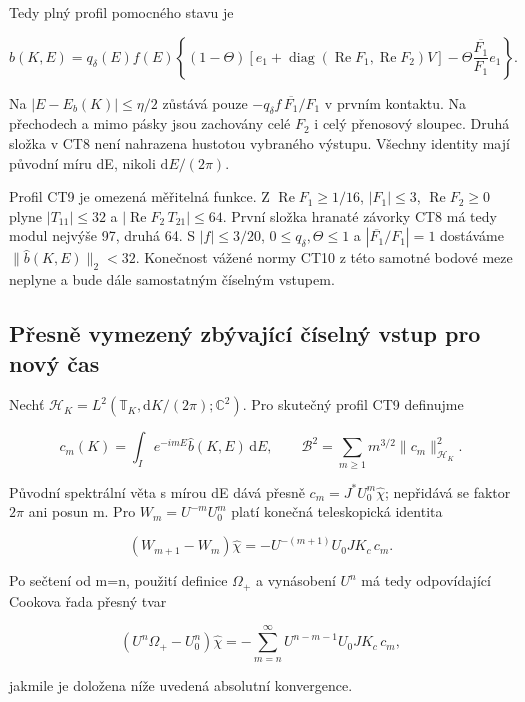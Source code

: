 \documentclass[11pt,a4paper]{article}
\theoremstyle{remark}\newtheorem{remark}[theorem]{Poznámka}
\numberwithin{equation}{section}
\begin{document}
Tedy plný profil pomocného stavu je

\[
\boxed{
\widehat b(K,E)=q_\delta(E)f(E)
\left\{(1-\Theta)
\left[e_1+\operatorname{diag}(\operatorname{Re}F_1,
\operatorname{Re}F_2)V\right]
-\Theta\frac{\overline{F_1}}{F_1}e_1\right\}.}
\tag{CT9}
\]

Na \(|E-E_b(K)|\le\eta/2\) zůstává pouze
\(-q_\delta f\,\overline{F_1}/F_1\) v prvním kontaktu. Na přechodech a
mimo pásky jsou zachovány celé \(F_2\) i celý přenosový sloupec. Druhá
složka v CT8 není nahrazena hustotou vybraného výstupu. Všechny identity
mají původní míru dE, nikoli \(\mathrm dE/(2\pi)\).

Profil CT9 je omezená měřitelná funkce. Z
\(\operatorname{Re}F_1\ge1/16\), \(|F_1|\le3\),
\(\operatorname{Re}F_2\ge0\) plyne \(|T_{11}|\le32\) a
\(|\operatorname{Re}F_2\,T_{21}|\le64\). První složka hranaté závorky
CT8 má tedy modul nejvýše 97, druhá 64. S \(|f|\le3/20\),
\(0\le q_\delta,\Theta\le1\) a \(|\overline{F_1}/F_1|=1\) dostáváme
\(\|\widehat b(K,E)\|_2<32\). Konečnost vážené normy CT10 z této samotné
bodové meze neplyne a bude dále samostatným číselným vstupem.

\hypertarget{pux159esnux11b-vymezenuxfd-zbuxfdvajuxedcuxed-ux10duxedselnuxfd-vstup-pro-novuxfd-ux10das}{%
\subsection{Přesně vymezený zbývající číselný vstup pro nový
čas}\label{pux159esnux11b-vymezenuxfd-zbuxfdvajuxedcuxed-ux10duxedselnuxfd-vstup-pro-novuxfd-ux10das}}

Nechť \(\mathcal H_K=L^2(\mathbb T_K,\mathrm dK/(2\pi);\mathbb C^2)\).
Pro skutečný profil CT9 definujme

\[
c_m(K)=\int_I e^{-imE}\widehat b(K,E)\,\mathrm dE,
\qquad
\mathcal B^2=\sum_{m\ge1}m^{3/2}\|c_m\|_{\mathcal H_K}^2.
\tag{CT10}
\]

Původní spektrální věta s mírou dE dává přesně
\(c_m=J^*U_0^m\widehat\chi\); nepřidává se faktor \(2\pi\) ani posun m.
Pro \(W_m=U^{-m}U_0^m\) platí konečná teleskopická identita

\[
(W_{m+1}-W_m)\widehat\chi
=-U^{-(m+1)}U_0J K_c\,c_m.
\]

Po sečtení od m=n, použití definice \(\Omega_+\) a vynásobení \(U^n\) má
tedy odpovídající Cookova řada přesný tvar

\[
(U^n\Omega_+-U_0^n)\widehat\chi
=-\sum_{m=n}^{\infty}U^{n-m-1}U_0J K_c\,c_m,
\]

jakmile je doložena níže uvedená absolutní konvergence.
\end{document}
